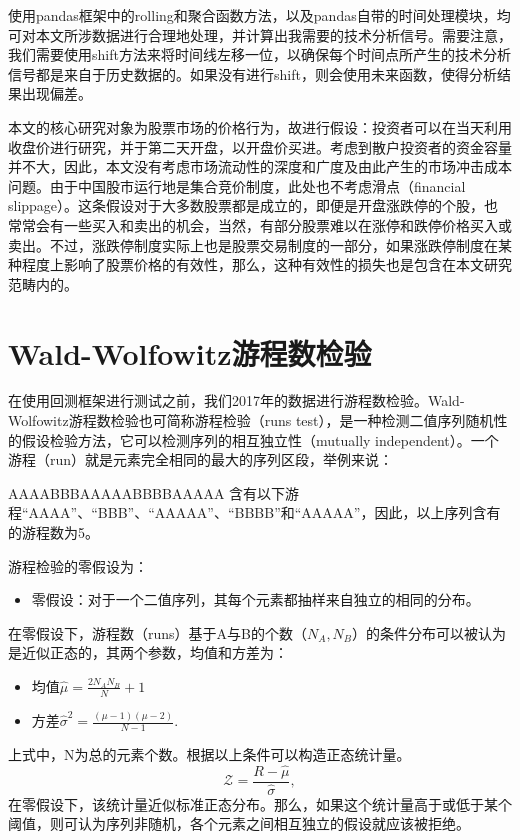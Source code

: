 \documentclass[twoside,longtitle]{LZUthesis}
\begin{document}
使用pandas框架中的rolling和聚合函数方法，以及pandas自带的时间处理模块，均可对本文所涉数据进行合理地处理，并计算出我需要的技术分析信号。需要注意，我们需要使用shift方法来将时间线左移一位，以确保每个时间点所产生的技术分析信号都是来自于历史数据的。如果没有进行shift，则会使用未来函数，使得分析结果出现偏差。

本文的核心研究对象为股票市场的价格行为，故进行假设：投资者可以在当天利用收盘价进行研究，并于第二天开盘，以开盘价买进。考虑到散户投资者的资金容量并不大，因此，本文没有考虑市场流动性的深度和广度及由此产生的市场冲击成本问题。由于中国股市运行地是集合竞价制度，此处也不考虑滑点（financial slippage）。这条假设对于大多数股票都是成立的，即便是开盘涨跌停的个股，也常常会有一些买入和卖出的机会，当然，有部分股票难以在涨停和跌停价格买入或卖出。不过，涨跌停制度实际上也是股票交易制度的一部分，如果涨跌停制度在某种程度上影响了股票价格的有效性，那么，这种有效性的损失也是包含在本文研究范畴内的。



\section{Wald-Wolfowitz游程数检验}
在使用回测框架进行测试之前，我们2017年的数据进行游程数检验。Wald-Wolfowitz游程数检验也可简称游程检验（runs test），是一种检测二值序列随机性的假设检验方法，它可以检测序列的相互独立性（mutually independent）。一个游程（run）就是元素完全相同的最大的序列区段，举例来说：

AAAABBBAAAAABBBBAAAAA
含有以下游程“AAAA”、“BBB”、“AAAAA”、“BBBB”和“AAAAA”，因此，以上序列含有的游程数为5。

游程检验的零假设为：
\begin{itemize}
    \item 零假设：对于一个二值序列，其每个元素都抽样来自独立的相同的分布。
\end{itemize}

在零假设下，游程数（runs）基于A与B的个数（$N_A,N_B$）的条件分布可以被认为是近似正态的，其两个参数，均值和方差为：
\begin{itemize}
    \item 均值$\hat{\mu}=\frac{2N_A N_B}{N}+1$
    \item 方差$\hat{\sigma}^2=\frac{(\mu-1)(\mu-2)}{N-1}$.
\end{itemize}
上式中，N为总的元素个数。根据以上条件可以构造正态统计量。
\[
\mathcal{Z}=\frac{R-\hat{\mu}}{\hat{\sigma}},
\]
在零假设下，该统计量近似标准正态分布。那么，如果这个统计量高于或低于某个阈值，则可认为序列非随机，各个元素之间相互独立的假设就应该被拒绝。
\end{document}
